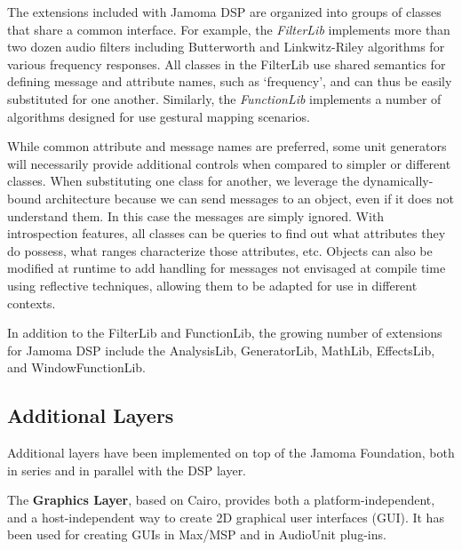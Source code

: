 \documentclass[twoside,10pt]{article}
\begin{document}
The extensions included with Jamoma DSP are organized into groups of classes that share a common interface.  For example, the \emph{FilterLib} implements more than two dozen audio filters including Butterworth and Linkwitz-Riley algorithms for various frequency responses.  All classes in the FilterLib use shared semantics for defining message and attribute names, such as `frequency', and can thus be easily substituted for one another.  Similarly, the \emph{FunctionLib} implements a number of algorithms designed for use gestural mapping scenarios.  

While common attribute and message names are preferred, some unit generators will necessarily provide additional controls when compared to simpler or different classes.  When substituting one class for another, we leverage the dynamically-bound architecture because we can send messages to an object, even if it does not understand them.  In this case the messages are simply ignored.  With introspection features, all classes can be queries to find out what attributes they do possess, what ranges characterize those attributes, etc.  Objects can also be modified at runtime to add handling for messages not envisaged at compile time using reflective techniques, allowing them to be adapted for use in different contexts.

In addition to the FilterLib and FunctionLib, the growing number of extensions for Jamoma DSP include the AnalysisLib, GeneratorLib, MathLib, EffectsLib, and WindowFunctionLib.




\subsection{Additional Layers} %

Additional layers have been implemented on top of the Jamoma Foundation, both in series and in parallel with the DSP layer.  

The \textbf{Graphics Layer}\cite{web10}, based on Cairo\cite{web11}, provides both a platform-independent, and a host-independent way to create 2D graphical user interfaces (GUI). It has been used for creating GUIs in Max/MSP and in AudioUnit plug-ins.
\end{document}
